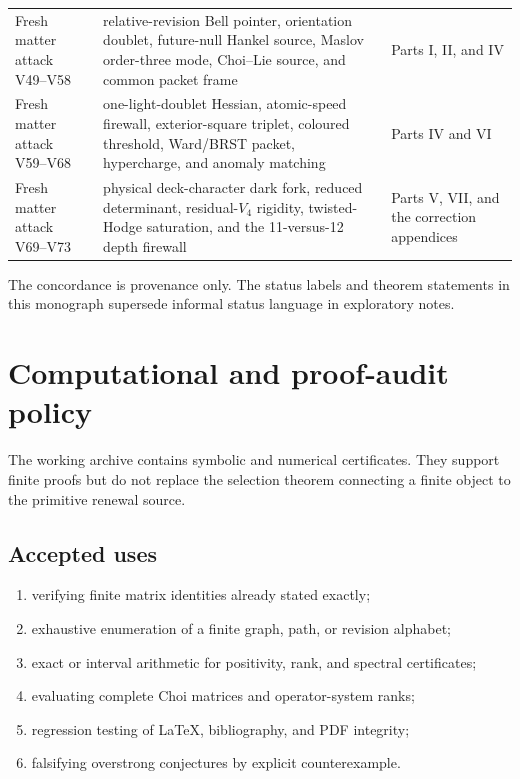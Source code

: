 \documentclass[11pt,oneside,openany]{book}
\numberwithin{equation}{chapter}
\theoremstyle{definition}
\theoremstyle{remark}
\begin{document}
\begin{longtable}{@{}p{}p{}p{}@{}}
Fresh matter attack V49--V58
& relative-revision Bell pointer, orientation doublet, future-null Hankel
  source, Maslov order-three mode, Choi--Lie source, and common packet frame
& Parts I, II, and IV\\
Fresh matter attack V59--V68
& one-light-doublet Hessian, atomic-speed firewall, exterior-square triplet,
  coloured threshold, Ward/BRST packet, hypercharge, and anomaly matching
& Parts IV and VI\\
Fresh matter attack V69--V73
& physical deck-character dark fork, reduced determinant, residual-\(V_4\)
  rigidity, twisted-Hodge saturation, and the 11-versus-12 depth firewall
& Parts V, VII, and the correction appendices\\
\bottomrule
\end{longtable}

The concordance is provenance only.  The status labels and theorem statements
in this monograph supersede informal status language in exploratory notes.

\chapter{Computational and proof-audit policy}
\label{app:audit-policy}

The working archive contains symbolic and numerical certificates.  They
support finite proofs but do not replace the selection theorem connecting a
finite object to the primitive renewal source.

\section{Accepted uses}

\begin{enumerate}[label=\textup{(\arabic*)},leftmargin=2.2em]
\item verifying finite matrix identities already stated exactly;
\item exhaustive enumeration of a finite graph, path, or revision alphabet;
\item exact or interval arithmetic for positivity, rank, and spectral
      certificates;
\item evaluating complete Choi matrices and operator-system ranks;
\item regression testing of LaTeX, bibliography, and PDF integrity;
\item falsifying overstrong conjectures by explicit counterexample.
\end{enumerate}
\end{document}
